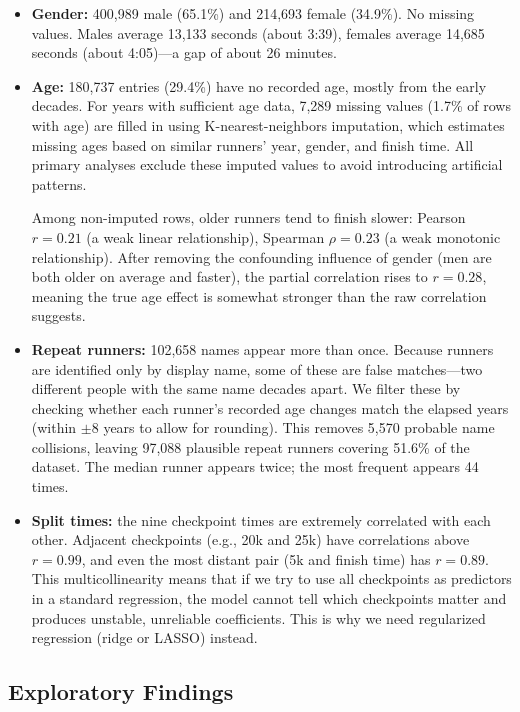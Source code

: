 \documentclass[conference]{IEEEtran}
\begin{document}
\begin{itemize}
    \item \textbf{Gender:} 400,989 male (65.1\%) and 214,693 female (34.9\%). No missing values. Males average 13,133 seconds (about 3:39), females average 14,685 seconds (about 4:05)---a gap of about 26 minutes.

    \item \textbf{Age:} 180,737 entries (29.4\%) have no recorded age, mostly from the early decades. For years with sufficient age data, 7,289 missing values (1.7\% of rows with age) are filled in using K-nearest-neighbors imputation, which estimates missing ages based on similar runners' year, gender, and finish time. All primary analyses exclude these imputed values to avoid introducing artificial patterns.

    Among non-imputed rows, older runners tend to finish slower: Pearson $r = 0.21$ (a weak linear relationship), Spearman $\rho = 0.23$ (a weak monotonic relationship). After removing the confounding influence of gender (men are both older on average and faster), the partial correlation rises to $r = 0.28$, meaning the true age effect is somewhat stronger than the raw correlation suggests.

    \item \textbf{Repeat runners:} 102,658 names appear more than once. Because runners are identified only by display name, some of these are false matches---two different people with the same name decades apart. We filter these by checking whether each runner's recorded age changes match the elapsed years (within $\pm$8 years to allow for rounding). This removes 5,570 probable name collisions, leaving 97,088 plausible repeat runners covering 51.6\% of the dataset. The median runner appears twice; the most frequent appears 44 times.

    \item \textbf{Split times:} the nine checkpoint times are extremely correlated with each other. Adjacent checkpoints (e.g., 20k and 25k) have correlations above $r = 0.99$, and even the most distant pair (5k and finish time) has $r = 0.89$. This multicollinearity means that if we try to use all checkpoints as predictors in a standard regression, the model cannot tell which checkpoints matter and produces unstable, unreliable coefficients. This is why we need regularized regression (ridge or LASSO) instead.
\end{itemize}

\subsection{Exploratory Findings}
\end{document}

